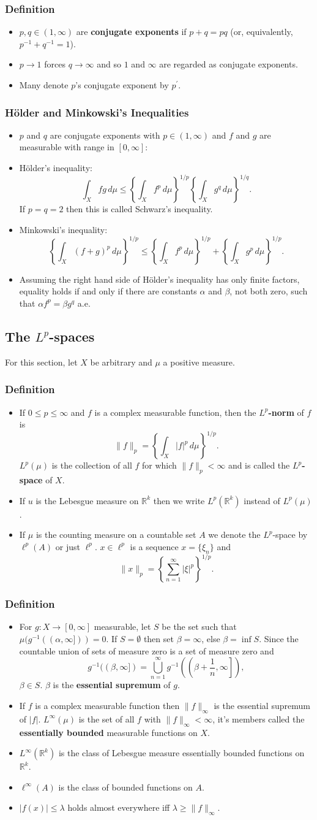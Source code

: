 \documentclass{article}
\newcounter{topicnumber}[section]
\newcommand{\steptopic}[1][1]{\addtocounter{topicnumber}{#1}}
\newcommand{\material}[1]{%
\subsection*{#1}%
\addcontentsline{toc}{subsection}{#1}%
}
\newenvironment{topic}[1]{%
\steptopic%
\subsubsection{#1}%
\begin{itemize}%
}{%
\end{itemize}%
}
\newcommand{\term}[1]{{\bf #1}}
\newcommand{\setup}{\item[\null]}
\newcommand{\remark}{\item}
\newcommand{\note}{\item[{\em Note:}]}
\begin{document}
\begin{topic}{Definition}
\remark $p, q \in (1, \infty)$ are \term{conjugate exponents} if $p + q = pq$ (or, equivalently, $p^{-1} + q^{-1} = 1$).
\remark $p \to 1$ forces $q \to \infty$ and so $1$ and $\infty$ are regarded as conjugate exponents.
\remark Many denote $p$'s conjugate exponent by $p^\prime$.
\end{topic}

\begin{topic}{H\"older and Minkowski's Inequalities}
\setup $p$ and $q$ are conjugate exponents with $p \in (1, \infty)$ and $f$ and $g$ are measurable with range in $[0, \infty]$:
\remark H\"older's inequality: $$\int_X fg\,d\mu \leq \left\{\int_X f^p\,d\mu\right\}^{1/p} \left\{\int_X g^q\,d\mu\right\}^{1/q}.$$ If $p = q = 2$ then this is called Schwarz's inequality.
\remark Minkowski's inequality: $$\left\{\int_X (f+g)^p\,d\mu\right\}^{1/p} \leq \left\{\int_X f^p\,d\mu\right\}^{1/p} + \left\{\int_X g^p\,d\mu\right\}^{1/p}.$$
\note Assuming the right hand side of H\"older's inequality has only finite factors, equality holds if and only if there are constants $\alpha$ and $\beta$, not both zero, such that $\alpha f^p = \beta g^q$ a.e.
\end{topic}


\material{The $L^p$-spaces}
For this section, let $X$ be arbitrary and $\mu$ a positive measure.

\begin{topic}{Definition}
\remark If $0 \leq p \leq \infty$ and $f$ is a complex measurable function, then the \term{$L^p$-norm} of $f$ is $$\|f\|_p = \left\{\int_X |f|^p\,d\mu\right\}^{1/p}.$$ $L^p(\mu)$ is the collection of all $f$ for which $\|f\|_p < \infty$ and is called the \term{$L^p$-space} of $X$.
\remark If $u$ is the Lebesgue measure on $\mathbb{R}^k$ then we write $L^p(\mathbb{R}^k)$ instead of $L^p(\mu)$.
\remark If $\mu$ is the counting measure on a countable set $A$ we denote the $L^p$-space by $\ell^p(A)$ or just $\ell^p$. $x \in \ell^p$ is a sequence $x = \{\xi_n\}$ and $$\|x\|_p = \left\{\sum_{n=1}^\infty |\xi|^p\right\}^{1/p}.$$
\end{topic}

\begin{topic}{Definition}
\remark For $g : X \to [0, \infty]$ measurable, let $S$ be the set such that $\mu(g^{-1}((\alpha, \infty])) = 0$. If $S = \emptyset$ then set $\beta = \infty$, else $\beta = \inf S$. Since the countable union of sets of measure zero is a set of measure zero and $$g^{-1}((\beta, \infty]) = \bigcup_{n=1}^\infty g^{-1}\left(\left(\beta + \dfrac{1}{n}, \infty\right]\right),$$ $\beta \in S$. $\beta$ is the \term{essential supremum} of $g$.
\remark If $f$ is a complex measurable function then $\|f\|_\infty$ is the essential supremum of $|f|$. $L^\infty(\mu)$ is the set of all $f$ with $\|f\|_\infty < \infty$, it's members called the \term{essentially bounded} measurable functions on $X$.
\remark $L^\infty(\mathbb{R}^k)$ is the class of Lebesgue measure essentially bounded functions on $\mathbb{R}^k$.
\remark $\ell^\infty(A)$ is the class of bounded functions on $A$.
\note $|f(x)| \leq \lambda$ holds almost everywhere iff $\lambda \geq \|f\|_\infty$.
\end{topic}
\end{document}
